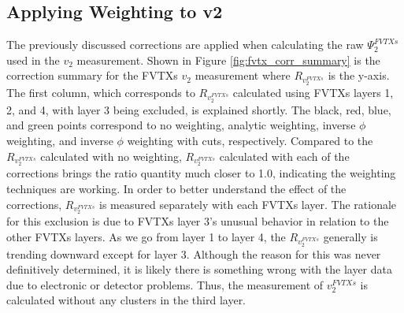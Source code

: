 \subsection{Applying Weighting to v2}
The previously discussed corrections are applied when calculating the raw $\Psi_2^{FVTXs}$ used in the $v_2$ measurement. Shown in Figure \ref{fig:fvtx_corr_summary} is the correction summary for the FVTXs $v_2$ measurement where $R_{v_2^{FVTXs}}$ is the y-axis. The first column, which corresponds to $R_{v_2^{FVTXs}}$ calculated using FVTXs layers 1, 2, and 4, with layer 3 being excluded, is explained shortly. The black, red, blue, and green points correspond to no weighting, analytic weighting, inverse $\phi$ weighting, and inverse $\phi$ weighting with cuts, respectively. Compared to the $R_{v_2^{FVTXs}}$ calculated with no weighting, $R_{v_2^{FVTXs}}$ calculated with each of the corrections brings the ratio quantity much closer to 1.0, indicating the weighting techniques are working.  In order to better understand the effect of the corrections, $R_{v_2^{FVTXs}}$ is measured separately with each FVTXs layer. The rationale for this exclusion is due to FVTXs layer 3's unusual behavior in relation to the other FVTXs layers. As we go from layer 1 to layer 4, the $R_{v_2^{FVTXs}}$ generally is trending downward except for layer 3. Although the reason for this was never definitively determined, it is likely there is something wrong with the layer data due to electronic or detector problems. Thus, the measurement of $v_2^{FVTXs}$ is calculated without any clusters in the third layer.


